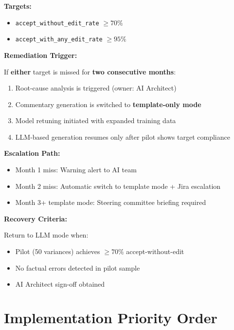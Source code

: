 \begin{tcolorbox}[colback=orange!5,colframe=orange!70,title=Quality Metrics Remediation Protocol]

\textbf{Targets:}
\begin{itemize}
    \item \texttt{accept\_without\_edit\_rate} $\geq 70\%$
    \item \texttt{accept\_with\_any\_edit\_rate} $\geq 95\%$
\end{itemize}

\textbf{Remediation Trigger:}

If \textbf{either} target is missed for \textbf{two consecutive months}:

\begin{enumerate}
    \item Root-cause analysis is triggered (owner: AI Architect)
    \item Commentary generation is switched to \textbf{template-only mode}
    \item Model retuning initiated with expanded training data
    \item LLM-based generation resumes only after pilot shows target compliance
\end{enumerate}

\textbf{Escalation Path:}
\begin{itemize}
    \item Month 1 miss: Warning alert to AI team
    \item Month 2 miss: Automatic switch to template mode + Jira escalation
    \item Month 3+ template mode: Steering committee briefing required
\end{itemize}

\textbf{Recovery Criteria:}

Return to LLM mode when:
\begin{itemize}
    \item Pilot (50 variances) achieves $\geq 70\%$ accept-without-edit
    \item No factual errors detected in pilot sample
    \item AI Architect sign-off obtained
\end{itemize}
\end{tcolorbox}

\section{Implementation Priority Order}
\label{sec:impl-priority}

